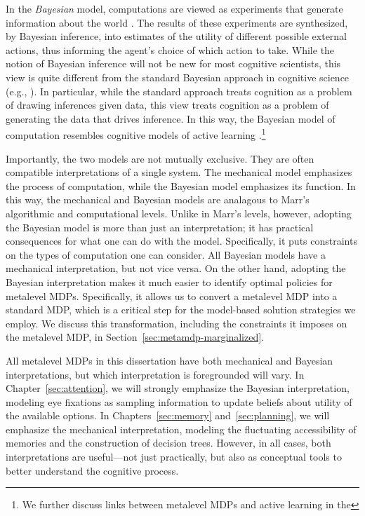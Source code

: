In the \emph{Bayesian} model, computations are viewed as experiments that generate information about the world \citep{matheson1968economic}. The results of these experiments are synthesized, by Bayesian inference, into estimates of the utility of different possible external actions, thus informing the agent's choice of which action to take. While the notion of Bayesian inference will not be new for most cognitive scientists, this view is quite different from the standard Bayesian approach in cognitive science (e.g., \citealp{tenenbaum2011how}). In particular, while the standard approach treats cognition as a problem of drawing inferences given data, this view treats cognition as a problem of generating the data that drives inference. In this way, the Bayesian model of computation resembles cognitive models of active learning \citep{gureckis2012selfdirected,gottlieb2013informationseeking}.\footnote{We further discuss links between metalevel MDPs and active learning in the }

Importantly, the two models are not mutually exclusive. They are often compatible interpretations of a single system. The mechanical model emphasizes the process of computation, while the Bayesian model emphasizes its function. In this way, the mechanical and Bayesian models are analagous to Marr's algorithmic and computational levels. Unlike in Marr's levels, however, adopting the Bayesian model is more than just an interpretation; it has practical consequences for what one can do with the model. Specifically, it puts constraints on the types of computation one can consider. All Bayesian models have a mechanical interpretation, but not vice versa. On the other hand, adopting the Bayesian interpretation makes it much easier to identify optimal policies for metalevel MDPs. Specifically, it allows us to convert a metalevel MDP into a standard MDP, which is a critical step for the model-based solution strategies we employ. We discuss this transformation, including the constraints it imposes on the metalevel MDP, in Section~\ref{sec:metamdp-marginalized}.

All metalevel MDPs in this dissertation have both mechanical and Bayesian interpretations, but which interpretation is foregrounded will vary. In Chapter~\ref{sec:attention}, we will strongly emphasize the Bayesian interpretation, modeling eye fixations as sampling information to update beliefs about utility of the available options. In Chapters~\ref{sec:memory} and~\ref{sec:planning}, we will emphasize the mechanical interpretation, modeling the fluctuating accessibility of memories and the construction of decision trees. However, in all cases, both interpretations are useful---not just practically, but also as conceptual tools to better understand the cognitive process.

